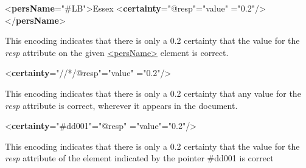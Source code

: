 \par\bgroup{}\exampleFont \begin{shaded}\noindent\mbox{}{<\textbf{persName}\hspace*{1em}{resp}="{\#LB}">}Essex\mbox{}\newline 
{<\textbf{certainty}\hspace*{1em}{match}="{@resp}"\hspace*{1em}{locus}="{value}"\mbox{}\newline 
\hspace*{1em}\hspace*{1em}{degree}="{0.2}"/>}\mbox{}\newline 
{</\textbf{persName}>}\end{shaded}\egroup\par \noindent  This encoding indicates that there is only a 0.2 certainty that the value for the {\itshape resp} attribute on the given \hyperref[TEI.persName]{<persName>} element is correct.\par
\par\bgroup{}\exampleFont \begin{shaded}\noindent\mbox{}{<\textbf{certainty}\hspace*{1em}{match}="{//*/@resp}"\hspace*{1em}{locus}="{value}"\mbox{}\newline 
\hspace*{1em}{degree}="{0.2}"/>}\end{shaded}\egroup\par \noindent  This encoding indicates that there is only a 0.2 certainty that any value for the {\itshape resp} attribute is correct, wherever it appears in the document.\par
\par\bgroup{}\exampleFont \begin{shaded}\noindent\mbox{}{<\textbf{certainty}\hspace*{1em}{target}="{\#dd001}"\hspace*{1em}{match}="{@resp}"\mbox{}\newline 
\hspace*{1em}{locus}="{value}"\hspace*{1em}{degree}="{0.2}"/>}\end{shaded}\egroup\par \noindent  This encoding indicates that there is only a 0.2 certainty that the value for the {\itshape resp} attribute of the element indicated by the pointer \#dd001 is correct\par
